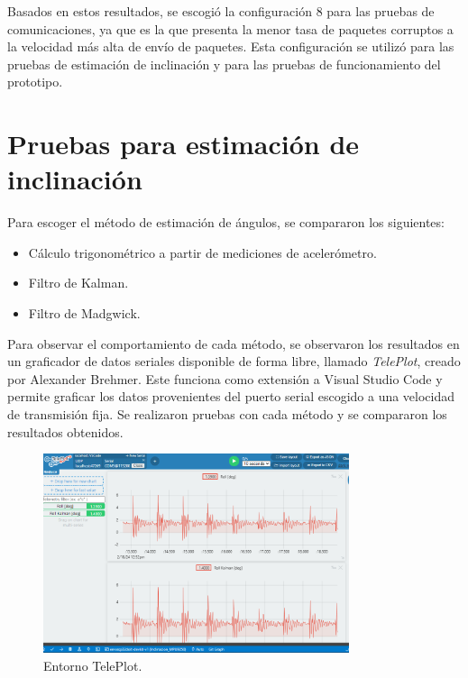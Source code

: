 Basados en estos resultados, se escogió la configuración 8 para las pruebas de comunicaciones, ya que es la que presenta la menor tasa de paquetes corruptos a la velocidad más alta de envío de paquetes. Esta configuración se utilizó para las pruebas de estimación de inclinación y para las pruebas de funcionamiento del prototipo.

\section{Pruebas para estimación de inclinación}

Para escoger el método de estimación de ángulos, se compararon los siguientes:

\begin{itemize}
    \item Cálculo trigonométrico a partir de mediciones de acelerómetro.
    \item Filtro de Kalman.
    \item Filtro de Madgwick.
\end{itemize}

 Para observar el comportamiento de cada método, se observaron los resultados en un graficador de datos seriales disponible de forma libre, llamado \textit{TelePlot}, creado por Alexander Brehmer. Este funciona como extensión a Visual Studio Code y permite graficar los datos provenientes del puerto serial escogido a una velocidad de transmisión fija. Se realizaron pruebas con cada método y se compararon los resultados obtenidos. 

 \begin{figure}[H]
    \centering
    \includegraphics[width = 0.8\textwidth]{imagenes/cap3_resultados/Pruebas ACL/Inclinacion/Comparacion entre Metodo1 (ACL) y Metodo 2 (Kalman) ante vibraciones.png}
    \caption{Entorno TelePlot.}
    \label{fig:teleplot}
\end{figure}

